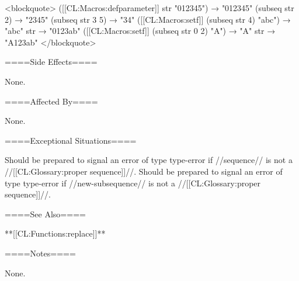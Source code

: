 <blockquote> ([[CL:Macros:defparameter]] str "012345") → "012345" (subseq str 2) → "2345" (subseq str 3 5) → "34" ([[CL:Macros:setf]] (subseq str 4) "abc") → "abc" str → "0123ab" ([[CL:Macros:setf]] (subseq str 0 2) "A") → "A" str → "A123ab" </blockquote>

====Side Effects====

None.

====Affected By====

None.

====Exceptional Situations====

Should be prepared to signal an error of type type-error if //sequence// is not a //[[CL:Glossary:proper sequence]]//. Should be prepared to signal an error of type type-error if //new-subsequence// is not a //[[CL:Glossary:proper sequence]]//.

====See Also====

**[[CL:Functions:replace]]**

====Notes====

None.

 
